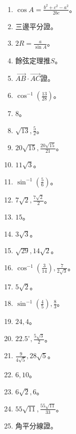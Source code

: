 \begin{enumerate}[label=\arabic*.]
    \item $\cos A = \frac{b^2 + c^2 - a^2}{2bc}$。
    \item 三邊平分證。
    \item $2R = \frac{a}{\sin A}$。
    \item 餘弦定理推$S$。
    \item $\vec{AB} \cdot \vec{AC}$證。
    \item $\cos^{-1}(\frac{13}{28})$。
    \item $8$。
    \item $\sqrt{13}, \frac{5}{2}$。
    \item $20\sqrt{15}, \frac{20\sqrt{15}}{21}$。
    \item $11\sqrt{3}$。
    \item $\sin^{-1}(\frac{5}{6})$。
    \item $7\sqrt{2}, \frac{7\sqrt{2}}{2}$。
    \item $15$。
    \item $3\sqrt{3}$。
    \item $\sqrt{29}, 14\sqrt{2}$。
    \item $\cos^{-1}(\frac{3}{14}), \frac{7}{2\sqrt{3}}$。
    \item $5\sqrt{2}$。
    \item $\sin^{-1}(\frac{4}{5}), \frac{8}{3}$。
    \item $24, 4$。
    \item $22.5^\circ, \frac{5\sqrt{3}}{2}$。
    \item $\frac{9}{4\sqrt{5}}, 28\sqrt{5}$。
    \item $6, 10$。
    \item $6\sqrt{2}, 6$。
    \item $55\sqrt{11}, \frac{55\sqrt{11}}{33}$。
    \item 角平分線證。
\end{enumerate}

